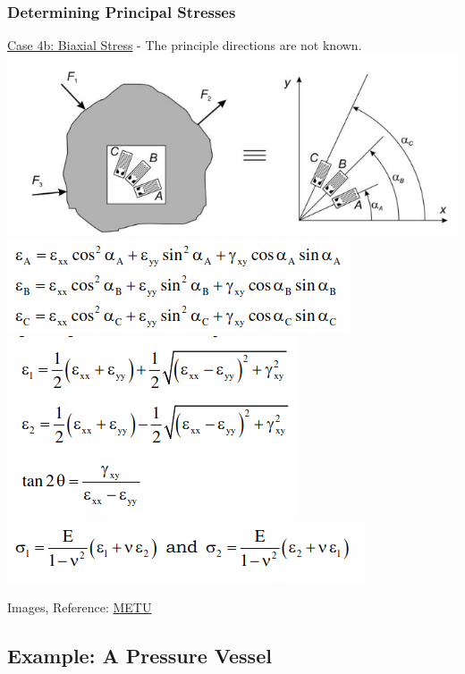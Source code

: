 \documentclass[fleqn]{beamer} %
\newcommand{\sectionIIIsubsectionIIItitle}{Determining Principal Stresses}
\newcommand{\sectionIIIsubsectionIVtitle}{Example: A Pressure Vessel}
\begin{document}
			\begin{frame}[containsverbatim]
				\frametitle{\sectionIIIsubsectionIIItitle}\scriptsize

				\underline{Case 4b: Biaxial Stress} - The principle directions are not known.\vspc
\includegraphics[scale=.25]{images/metu_fig5.png}
\includegraphics[scale=.3]{images/metu_fig8.png}\includegraphics[scale=.3]{images/metu_fig9.png}\includegraphics[scale=.3]{images/metu_fig10.png}


\vspace{10mm}
{\tiny Images, Reference: \href{http://courses.me.metu.edu.tr/courses/me410/exp5/ME410_exp5_theory.pdf}{METU}}
				
			\end{frame}


			

		\subsection{\sectionIIIsubsectionIVtitle}\label{sectionIIIsubsectionIV}	
		
\end{document}
